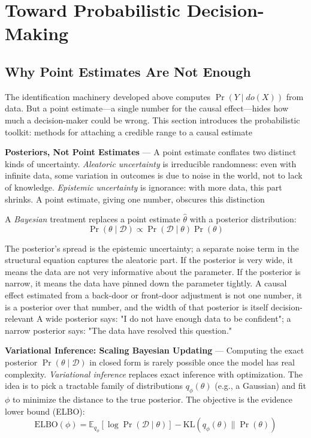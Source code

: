 \section{Toward Probabilistic Decision-Making}
\label{sec:toward-probabilistic-decision-making}

\subsection{Why Point Estimates Are Not Enough}
\label{subsec:why-point-estimates-are-not-enough}

The identification machinery developed above computes $\Pr(Y \mid do(X))$ from
data. But a point estimate—a single number for the causal effect—hides how much a
decision-maker could be wrong. This section introduces the probabilistic toolkit:
methods for attaching a credible range to a causal estimate

\textbf{Posteriors, Not Point Estimates} --- A point estimate conflates two distinct
kinds of uncertainty. \emph{Aleatoric uncertainty} is irreducible randomness:
even with infinite data, some variation in outcomes is due to noise in the world,
not to lack of knowledge. \emph{Epistemic uncertainty} is ignorance: with more data,
this part shrinks. A point estimate, giving one number, obscures this distinction

A \emph{Bayesian} treatment replaces a point estimate $\hat{\theta}$ with a posterior
distribution:
\begin{equation}
  \Pr(\theta \mid \mathcal{D}) \propto \Pr(\mathcal{D}\mid \theta) \Pr(\theta) \label{eq:bayes-rule}
\end{equation}

The posterior's spread is the epistemic uncertainty; a separate noise term in
the structural equation captures the aleatoric part. If the posterior is very wide,
it means the data are not very informative about the parameter. If the posterior
is narrow, it means the data have pinned down the parameter tightly. A causal effect
estimated from a back-door or front-door adjustment is not one number, it is a
posterior over that number, and the width of that posterior is itself decision-relevant
A wide posterior says: "I do not have enough data to be confident"; a narrow posterior
says: "The data have resolved this question."

\textbf{Variational Inference: Scaling Bayesian Updating} --- Computing the exact
posterior $\Pr(\theta \mid \mathcal{D})$ in closed form is rarely possible once the
model has real complexity. \emph{Variational inference} replaces exact inference
with optimization. The idea is to pick a tractable family of distributions
$q_{\phi}(\theta)$ (e.g., a Gaussian) and fit $\phi$ to minimize the distance to
the true posterior. The objective is the evidence lower bound (ELBO):
\begin{equation}
  \text{ELBO}(\phi) = \mathbb{E}_{q_\phi}[\log \Pr(\mathcal{D}\mid \theta)] - \text{KL}
  (q_{\phi}(\theta) \| \Pr(\theta)) \label{eq:elbo}
\end{equation}

